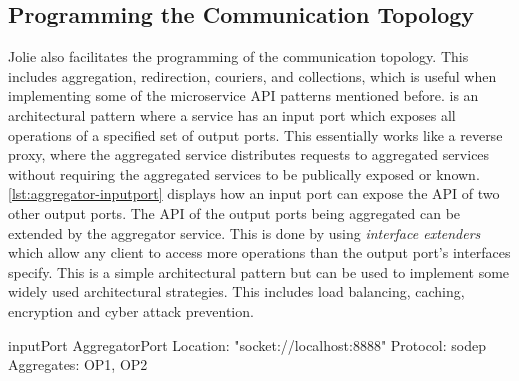 \subsection{Programming the Communication Topology}
Jolie also facilitates the programming of the communication topology. This includes aggregation, redirection, couriers, and collections, which is useful when 
implementing some of the microservice API patterns mentioned before.
 is an architectural pattern where a service has an input port which exposes all operations of a specified set of output ports. This essentially works like a reverse proxy, where the aggregated service distributes requests to aggregated services without
requiring the aggregated services to be publically exposed or known. \cref{lst:aggregator-inputport} displays how an input port can expose the API of two other output ports.
The API of the output ports being aggregated can be extended by the aggregator service. This is done by using \emph{interface extenders} which allow any client to access more operations than the output port's interfaces specify.
This is a simple architectural pattern but can be used to implement some widely used architectural strategies. This includes load balancing, caching, encryption and cyber attack prevention.

\begin{jolisting}[][caption={Input port which aggregates requests to some output ports, OP1 and OP2.}, label=lst:aggregator-inputport]
inputPort AggregatorPort {
    Location: "socket://localhost:8888"
    Protocol: sodep
    Aggregates: OP1, OP2
}
\end{jolisting}

